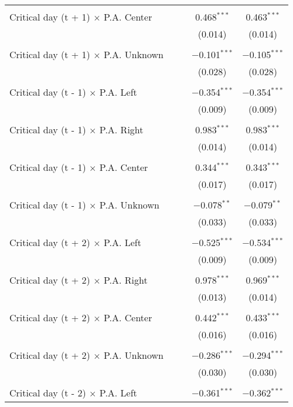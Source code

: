 \documentclass[
]{article}
\begin{document}
\begin{table}[!htbp]
{\begin{tabular}{@{\extracolsep{5pt}}lcccc}
  & & & & \\ 
 Critical day (t + 1) $\times$ P.A. Center &  &  & 0.468$^{***}$ & 0.463$^{***}$ \\ 
  &  &  & (0.014) & (0.014) \\ 
  & & & & \\ 
 Critical day (t + 1) $\times$ P.A. Unknown &  &  & $-$0.101$^{***}$ & $-$0.105$^{***}$ \\ 
  &  &  & (0.028) & (0.028) \\ 
  & & & & \\ 
 Critical day (t - 1) $\times$ P.A. Left &  &  & $-$0.354$^{***}$ & $-$0.354$^{***}$ \\ 
  &  &  & (0.009) & (0.009) \\ 
  & & & & \\ 
 Critical day (t - 1) $\times$ P.A. Right &  &  & 0.983$^{***}$ & 0.983$^{***}$ \\ 
  &  &  & (0.014) & (0.014) \\ 
  & & & & \\ 
 Critical day (t - 1) $\times$ P.A. Center &  &  & 0.344$^{***}$ & 0.343$^{***}$ \\ 
  &  &  & (0.017) & (0.017) \\ 
  & & & & \\ 
 Critical day (t - 1) $\times$ P.A. Unknown &  &  & $-$0.078$^{**}$ & $-$0.079$^{**}$ \\ 
  &  &  & (0.033) & (0.033) \\ 
  & & & & \\ 
 Critical day (t + 2) $\times$ P.A. Left &  &  & $-$0.525$^{***}$ & $-$0.534$^{***}$ \\ 
  &  &  & (0.009) & (0.009) \\ 
  & & & & \\ 
 Critical day (t + 2) $\times$ P.A. Right &  &  & 0.978$^{***}$ & 0.969$^{***}$ \\ 
  &  &  & (0.013) & (0.014) \\ 
  & & & & \\ 
 Critical day (t + 2) $\times$ P.A. Center &  &  & 0.442$^{***}$ & 0.433$^{***}$ \\ 
  &  &  & (0.016) & (0.016) \\ 
  & & & & \\ 
 Critical day (t + 2) $\times$ P.A. Unknown &  &  & $-$0.286$^{***}$ & $-$0.294$^{***}$ \\ 
  &  &  & (0.030) & (0.030) \\ 
  & & & & \\ 
 Critical day (t - 2) $\times$ P.A. Left &  &  & $-$0.361$^{***}$ & $-$0.362$^{***}$ \\ 

\end{tabular}}
\end{table}
\end{document}
